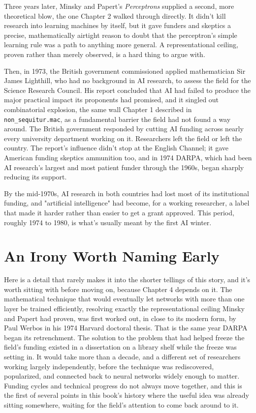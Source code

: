 Three years later, Minsky and Papert's \emph{Perceptrons} supplied a second, more theoretical blow, the one Chapter 2 walked through directly. It didn't kill research into learning machines by itself, but it gave funders and skeptics a precise, mathematically airtight reason to doubt that the perceptron's simple learning rule was a path to anything more general. A representational ceiling, proven rather than merely observed, is a hard thing to argue with.

Then, in 1973, the British government commissioned applied mathematician Sir James Lighthill, who had no background in AI research, to assess the field for the Science Research Council. His report concluded that AI had failed to produce the major practical impact its proponents had promised, and it singled out combinatorial explosion, the same wall Chapter 1 described in \texttt{non\_sequitur.mac}, as a fundamental barrier the field had not found a way around. The British government responded by cutting AI funding across nearly every university department working on it. Researchers left the field or left the country. The report's influence didn't stop at the English Channel; it gave American funding skeptics ammunition too, and in 1974 DARPA, which had been AI research's largest and most patient funder through the 1960s, began sharply reducing its support.

By the mid-1970s, AI research in both countries had lost most of its institutional funding, and "artificial intelligence" had become, for a working researcher, a label that made it harder rather than easier to get a grant approved. This period, roughly 1974 to 1980, is what's usually meant by the first AI winter.

\section*{An Irony Worth Naming Early}

Here is a detail that rarely makes it into the shorter tellings of this story, and it's worth sitting with before moving on, because Chapter 4 depends on it. The mathematical technique that would eventually let networks with more than one layer be trained efficiently, resolving exactly the representational ceiling Minsky and Papert had proven, was first worked out, in close to its modern form, by Paul Werbos in his 1974 Harvard doctoral thesis. That is the same year DARPA began its retrenchment. The solution to the problem that had helped freeze the field's funding existed in a dissertation on a library shelf while the freeze was setting in. It would take more than a decade, and a different set of researchers working largely independently, before the technique was rediscovered, popularized, and connected back to neural networks widely enough to matter. Funding cycles and technical progress do not always move together, and this is the first of several points in this book's history where the useful idea was already sitting somewhere, waiting for the field's attention to come back around to it.

